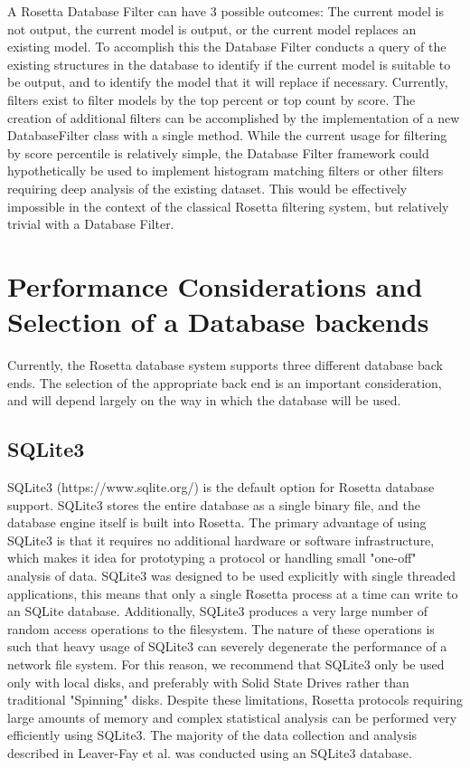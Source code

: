 A Rosetta Database Filter can have 3 possible outcomes:  The current model is not output, the current model is output, or the current model replaces an existing model.
To accomplish this the Database Filter conducts a query of the existing structures in the database  to identify if the current model is suitable to be output, and to identify the model that it will replace if necessary. 
Currently, filters exist to filter models by the top percent or top count by score.
The creation of additional filters can be accomplished by the implementation of a new DatabaseFilter class with a single method.
While the current usage for filtering by score percentile is relatively simple, the Database Filter framework could hypothetically be used to implement histogram matching filters or other filters requiring deep analysis of the existing dataset.
This would be effectively impossible in the context of the classical Rosetta filtering system, but relatively trivial with a Database Filter.

\section{Performance Considerations and Selection of a Database backends}

Currently, the Rosetta database system supports three different database back ends.
The selection of the appropriate back end is an important consideration, and will depend largely on the way in which the database will be used.

\subsection{SQLite3}
SQLite3 (https://www.sqlite.org/) is the default option for Rosetta database support.
SQLite3 stores the entire database as a single binary file, and the database engine itself is built into Rosetta.
The primary advantage of using SQLite3 is that it requires no additional hardware or software infrastructure, which makes it idea for prototyping a protocol or handling small "one-off" analysis of data.
SQLite3 was designed to be used explicitly with single threaded applications, this means that only a single Rosetta process at a time can write to an SQLite database.
Additionally, SQLite3 produces a very large number of random access operations to the filesystem.
The nature of these operations is such that heavy usage of SQLite3 can severely degenerate the performance of a network file system.
For this reason, we recommend that SQLite3 only be used only with local disks, and preferably with Solid State Drives rather than traditional "Spinning" disks.
Despite these limitations, Rosetta protocols requiring large amounts of memory and complex statistical analysis can be performed very efficiently using SQLite3.
The majority of the data collection and analysis described in Leaver-Fay et al. \citep{LeaverFay:2013fn} was conducted using an SQLite3 database.

